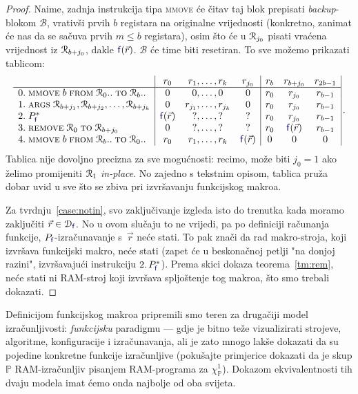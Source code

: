 \begin{proof}
Naime, zadnja instrukcija tipa \textsc{mmove} će čitav taj blok prepisati \emph{backup}-blokom $\mathcal B$, vrativši prvih $b$ registara na originalne vrijednosti (konkretno, zanimat će nas da se sačuva prvih $m\le b$ registara), osim što će u $\mathcal R_{j_0}$ pisati vraćena vrijednost iz $\mathcal R_{b+j_0}$, dakle $\f f(\vec r)$. $\mathcal B$ će time biti resetiran. To sve možemo prikazati tablicom:
\begin{equation}\label{eq:funmakrotab}
    \begin{array}{r@{\;}l|cr@{,\dotsc,\,}lc|ccc|}
      &                                                             & r_0          & r_1     & r_k     & r_{j_0}      & r_b & r_{b+j_0}    & r_{2b-1}\\\hline
0.&\textsc{mmove}\;b\;\textsc{from}\;\reg0..\;\textsc{to}\;\reg{b}..& 0            & 0       & 0       & 0            & r_0 & r_{j_0}      & r_{b-1} \\
1.&\textsc{args}\;\reg{b+j_1},\reg{b+j_2},\dotsc,\reg{b+j_k}        & 0            & r_{j_1} & r_{j_k} & 0            & r_0 & r_{j_0}      & r_{b-1} \\
2.&P_{\f{f}}^*                                                        & \f{f}(\vec r) & ?       & ?       & ?            & r_0 & r_{j_0}      & r_{b-1} \\
3.&\remove{0}{b+j_0}                                                & 0            & ?       & ?       & ?            & r_0 & \f f(\vec r) & r_{b-1}\\
4.&\textsc{mmove}\;b\;\textsc{from}\;\reg{b}..\;\textsc{to}\;\reg0..& r_0          & r_1     & r_k     & \f f(\vec r) & 0   & 0            & 0
    \end{array}\,\text.
\end{equation}
Tablica nije dovoljno precizna za sve mogućnosti: recimo, može biti $j_0=1$ ako želimo promijeniti $\mathcal R_{1}$ \emph{in-place}. No zajedno s tekstnim opisom, tablica pruža dobar uvid u sve što se zbiva pri izvršavanju funkcijskog makroa.

	Za tvrdnju~\ref{case:notin}, svo zaključivanje izgleda isto do trenutka kada moramo zaključiti $\vec r\in\dom{\f{f}}$. No u ovom slučaju to ne vrijedi, pa po definiciji računanja funkcije, $P_{\f{f}}$-izračunavanje s~$\vec r$ neće stati. To pak znači da rad makro-stroja, koji izvršava funkcijski makro, neće stati (zapet će u beskonačnoj petlji "na donjoj razini", izvršavajući instrukciju $2.\,P_{\f f}^*$). Prema skici dokaza teorema~\ref{tm:rem}, neće stati ni RAM-stroj koji izvršava spljoštenje tog makroa, što smo trebali dokazati.
\end{proof}

Definicijom funkcijskog makroa pripremili smo teren za drugačiji model iz\-ra\-čun\-lji\-vo\-sti: \emph{funkcijsku} paradigmu --- gdje je bitno teže vizualizirati strojeve, algoritme, konfiguracije i izračunavanja, ali je zato mnogo lakše dokazati da su pojedine konkretne funkcije izračunljive (pokušajte primjerice dokazati da je skup $\mathbb P$ RAM-izračunljiv pisanjem RAM-programa za $\chi_{\mathbb P}^1$). Dokazom ekvivalentnosti tih dvaju modela imat ćemo onda najbolje od oba svijeta.

